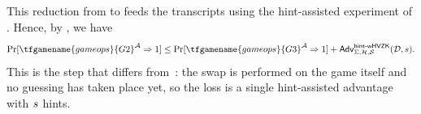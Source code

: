 This reduction from  to  feeds the transcripts using the hint-assisted \wHVZK experiment of .
Hence, by , we have
\begin{equation}\label{eq:g2g3}
    \Pr[\tfgamename{gameops}{G2}^\adv \Rightarrow 1]
    \leq \Pr[\tfgamename{gameops}{G3}^\adv \Rightarrow 1]
    + \hinthvzkadv{\Sigma}{\hintdistr}{\Sim}{\ddv, \numOSign}.
\end{equation}
This is the step that differs from~\cite{C:ABDPW25}: the swap is performed on
the \EUFCMA game itself and no guessing has taken place yet, so the loss is a
single hint-assisted \wHVZK advantage with $s$ hints.

